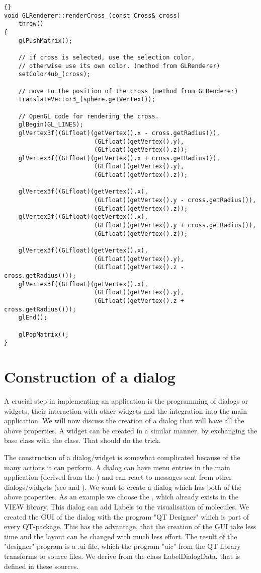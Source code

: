 \begin{lstlisting}{}
void GLRenderer::renderCross_(const Cross& cross)
	throw() 
{
	glPushMatrix();
	
	// if cross is selected, use the selection color,
	// otherwise use its own color. (method from GLRenderer)
	setColor4ub_(cross);  
	
	// move to the position of the cross (method from GLRenderer)
	translateVector3_(sphere.getVertex());
	
	// OpenGL code for rendering the cross.
	glBegin(GL_LINES);
	glVertex3f((GLfloat)(getVertex().x - cross.getRadius()),
						 (GLfloat)(getVertex().y),
						 (GLfloat)(getVertex().z));
	glVertex3f((GLfloat)(getVertex().x + cross.getRadius()),
						 (GLfloat)(getVertex().y),
						 (GLfloat)(getVertex().z));

	glVertex3f((GLfloat)(getVertex().x),
						 (GLfloat)(getVertex().y - cross.getRadius()),
						 (GLfloat)(getVertex().z));
	glVertex3f((GLfloat)(getVertex().x),
						 (GLfloat)(getVertex().y + cross.getRadius()),
						 (GLfloat)(getVertex().z));

	glVertex3f((GLfloat)(getVertex().x),
						 (GLfloat)(getVertex().y),
						 (GLfloat)(getVertex().z - cross.getRadius()));
	glVertex3f((GLfloat)(getVertex().x),
						 (GLfloat)(getVertex().y),
						 (GLfloat)(getVertex().z + cross.getRadius()));
	glEnd();

	glPopMatrix();
}
\end{lstlisting}


\section{Construction of a dialog}
\label{section:view_construction_of_a_dialog}

A crucial step in implementing an application is the programming of dialogs or
widgets, their interaction with other widgets and the integration into the
main application. We will now discuss the creation of a dialog that will have
all the above properties. A widget can be created in a similar manner, by
exchanging the  base class with the  class. That
should do the trick.

The construction of a dialog/widget is somewhat complicated because of the
many actions it can perform. A dialog can have menu entries in the main
application (derived from the ) and can react to messages
sent from other dialogs/widgets (see  and
). We want to create a dialog which has both of the
above properties. As an example we choose the , which already
exists in the VIEW library. This dialog can add Labels to the visualisation of
molecules.
We created the GUI of the dialog with the program "QT Designer" which is part
of every QT-package. This has the advantage, that the creation of the GUI take
less time and the layout can be changed with much less effort. 
The result of the "designer" program is a .ui file, which the program "uic"
from the QT-library transforms to source files. We derive from the class
LabelDialogData, that is defined in these sources.

